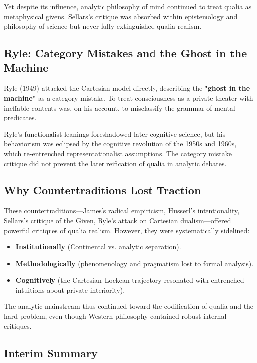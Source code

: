 \documentclass[11pt,a4paper]{article}
\begin{document}
Yet despite its influence, analytic philosophy of mind continued to treat qualia as metaphysical givens. Sellars's critique was absorbed within epistemology and philosophy of science but never fully extinguished qualia realism.

\subsection{Ryle: Category Mistakes and the Ghost in the Machine}

Ryle (1949) attacked the Cartesian model directly, describing the \textbf{"ghost in the machine"} as a category mistake. To treat consciousness as a private theater with ineffable contents was, on his account, to misclassify the grammar of mental predicates.

Ryle's functionalist leanings foreshadowed later cognitive science, but his behaviorism was eclipsed by the cognitive revolution of the 1950s and 1960s, which re-entrenched representationalist assumptions. The category mistake critique did not prevent the later reification of qualia in analytic debates.

\subsection{Why Countertraditions Lost Traction}

These countertraditions—James's radical empiricism, Husserl's intentionality, Sellars's critique of the Given, Ryle's attack on Cartesian dualism—offered powerful critiques of qualia realism. However, they were systematically sidelined:

\begin{itemize}
\item \textbf{Institutionally} (Continental vs. analytic separation).
\item \textbf{Methodologically} (phenomenology and pragmatism lost to formal analysis).
\item \textbf{Cognitively} (the Cartesian–Lockean trajectory resonated with entrenched intuitions about private interiority).
\end{itemize}

The analytic mainstream thus continued toward the codification of qualia and the hard problem, even though Western philosophy contained robust internal critiques.

\subsection{Interim Summary}
\end{document}
